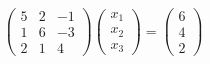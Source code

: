\documentclass[preview]{standalone}
\begin{document}
\begin{align*}
\begin{pmatrix}5 & 2 & -1 \\1 & 6 & -3 \\2 & 1 & 4\end{pmatrix}\begin{pmatrix} x_1 \\ x_2 \\ x_3 \end{pmatrix}= \begin{pmatrix} 6 \\ 4 \\ 2 \end{pmatrix}
\end{align*}
\end{document}
